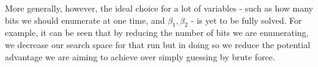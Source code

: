 \documentclass[a4paper, 10pt]{article}
\theoremstyle{definition}
\begin{document}
More generally, however, the ideal choice for a lot of variables - such as how many bits we should enumerate at one time, and $\beta_1, \beta_2$ - is yet to be fully solved. For example, it can be seen that by reducing the number of bits we are enumerating, we decrease our search space for that run but in doing so we reduce the potential advantage we are aiming to achieve over simply guessing by brute force.

\newpage
\nocite{*}
\printbibliography
\end{document}
